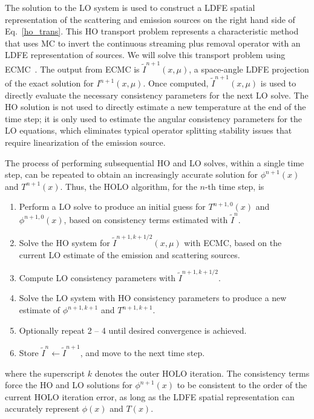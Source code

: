 \documentclass[11pt]{article}
\begin{document}
The solution to the LO system is used to construct a LDFE spatial representation of
the scattering and emission sources on the right hand side of Eq.~\eqref{ho_trans}.
 This HO transport problem represents a characteristic method that uses MC to
invert the continuous streaming plus removal operator with an LDFE representation of
sources. We will solve this transport problem using ECMC~\cite{jake}.  The output from ECMC is
$\tilde{I}^{n+1}(x,\mu)$, a space-angle LDFE projection of the exact solution for
$I^{n+1}(x,\mu)$.  Once computed, $\tilde{I}^{n+1}(x,\mu)$ is used
to directly evaluate the necessary consistency parameters for the next LO solve.   The HO solution is not used to directly estimate a new
temperature at the end of the time step; it is
only used to estimate the angular consistency parameters for the LO equations, which eliminates
typical operator splitting stability issues that require linearization of the emission source.

The process of performing subsequential HO and LO solves, within a single time step, can be repeated to obtain an increasingly accurate solution for $\phi^{n+1}(x)$ and $T^{n+1}(x)$.  Thus, the HOLO algorithm, for the $n$-th time step, is
\begin{enumerate}
\item Perform a LO solve to produce an initial guess for $T^{n+1,0}(x)$
    and $\phi^{n+1,0}(x)$, based on consistency terms estimated with $\tilde{I}^{n}$.
\item Solve the HO system for $\tilde{I}^{n+1,k+1/2}(x,\mu)$ with ECMC, based on the current
    LO estimate of the emission and scattering sources.%
\item Compute LO consistency parameters with $\tilde{I}^{n+1,k+1/2}$.  
\item Solve the LO system with HO consistency parameters to produce a new
    estimate of $\phi^{n+1,k+1}$ and $T^{n+1,k+1}$.
\item Optionally repeat 2 -- 4 until desired convergence is achieved.
\item Store $\tilde{I}^{n}\leftarrow\tilde{I}^{n+1}$, and move to the next time step.
\end{enumerate}
where the superscript $k$ denotes the outer HOLO iteration.
The consistency terms force the HO
and LO solutions for $\phi^{n+1}(x)$ to be consistent to the order of the current HOLO
iteration error, as long as the LDFE spatial representation can accurately represent
$\phi(x)$ and $T(x)$.
\end{document}
